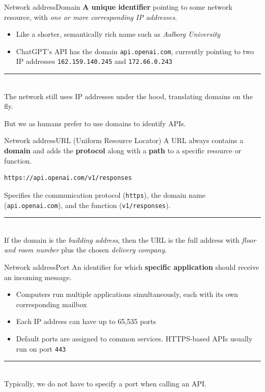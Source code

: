 \documentclass[aspectratio=169]{beamer}
\def\hr{\noindent\rule{\textwidth}{0.4pt}\\}
\begin{document}
\begin{frame}[fragile]{Network address}{Domain}
\textbf{A unique identifier} pointing to some network resource, with \textit{one or more corresponding IP addresses}.
        \begin{itemize}
            \item Like a shorter, semantically rich name such as \textit{Aalborg University}
            \item ChatGPT's API has the domain \texttt{api.openai.com}, currently pointing to two IP addresses \texttt{162.159.140.245} and \texttt{172.66.0.243}
        \end{itemize}

    \vspace{0.5em}
    \hr
    The network still uses IP addresses under the hood, translating domains on the fly.

    But we as humans prefer to use domains to identify APIs.
\note{
}
\end{frame}


\begin{frame}[fragile]{Network address}{URL (Uniform Resource Locator)}
A URL always contains a \textbf{domain} and adds the \textbf{protocol} along with a \textbf{path} to a specific resource or function.
        \begin{verbatim}
https://api.openai.com/v1/responses
        \end{verbatim}
        Specifies the communication protocol (\texttt{https}), the domain name (\texttt{api.openai.com}), and the function (\texttt{v1/responses}).

  \vspace{0.5em}
    \hr
If the domain is the \textit{building address}, then the URL is the full address with \textit{floor and room number} plus the chosen \textit{delivery company}.
\note{
}
\end{frame}


\begin{frame}{Network address}{Port}
An identifier for which \textbf{specific application} should receive an incoming message.
        \begin{itemize}
            \item Computers run multiple applications simultaneously, each with its own corresponding mailbox
            \item Each IP address can have up to 65,535 ports
            \item Default ports are assigned to common services. HTTPS-based APIs usually run on port \texttt{443}
        \end{itemize}

  \vspace{0.5em}
    \hr
    Typically, we do not have to specify a port when calling an API.
\note{
}
\end{frame}
\end{document}
